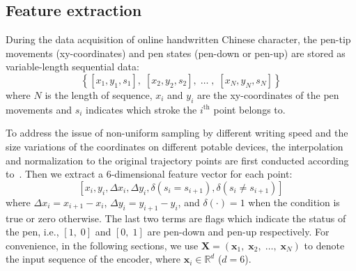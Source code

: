 \documentclass[a4paper,conference]{IEEEtran}
\begin{document}
\subsection{Feature extraction}
\label{sec:Feature extraction}
During the data acquisition of online handwritten Chinese character, the pen-tip movements (xy-coordinates) and pen states (pen-down or pen-up) are stored as variable-length sequential data:
\begin{equation}\label{eq:trajectory input}
\left \{\left[ {{x_1},{y_1},{s_1}} \right],\;\left[ {{x_2},{y_2},{s_2}} \right],\; \ldots \;,\;\left[ {{x_N},{y_N},{s_N}} \right] \right\}
\end{equation}
where $N$ is the length of sequence, ${x_i}$ and ${y_i}$ are the xy-coordinates of the pen movements and ${s_i}$ indicates which stroke the $i^{\textrm{th}}$ point belongs to.

To address the issue of non-uniform sampling by different writing speed and the size variations of the coordinates on different potable devices, the interpolation and normalization to the original trajectory points are first conducted according to~\cite{zhang2017drawing}. Then we extract a 6-dimensional feature vector for each point:
\begin{equation}\label{eq:6dimensional feature}
\left[ {{x_i},{y_i},\Delta {x_i},\Delta {y_i},\delta ({s_i} = {s_{i + 1}}),\delta ({s_i} \ne {s_{i + 1}})} \right]
\end{equation}
where $\Delta {x_i}={x_{i+1}}-{x_i}$, $\Delta {y_i}={y_{i+1}}-{y_i}$, and $\delta ( \cdot ) = 1$ when the condition is true or zero otherwise. The last two terms are flags which indicate the status of the pen, i.e., $\left[ {1,\;0} \right]$ and $\left[ {0,\;1} \right]$ are pen-down and pen-up respectively. For convenience, in the following sections, we use $\mathbf{X}=\left( {{\mathbf{x}_1},\;{\mathbf{x}_2},\; \ldots ,\;{\mathbf{x}_N}} \right)$ to denote the input sequence of the encoder, where ${\mathbf{x}_i} \in {\mathbb{R}^d}$ ($d=6$).
\end{document}
